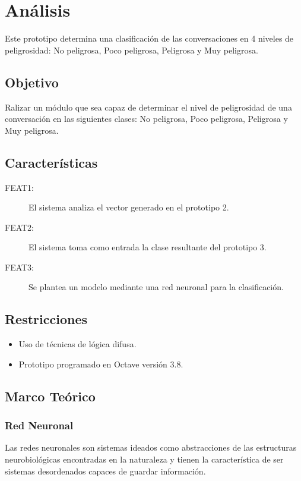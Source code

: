 \section{An\'alisis}
Este prototipo determina una clasificaci\'on de las conversaciones en 4 niveles de peligrosidad: No peligrosa, Poco peligrosa, Peligrosa y Muy peligrosa. 

\subsection{Objetivo}
Ralizar un m\'odulo que sea capaz de determinar el nivel de peligrosidad de una conversaci\'on en las siguientes clases: No peligrosa, Poco peligrosa, Peligrosa y Muy peligrosa. 

\subsection{Caracter\'isticas}
\begin{description}
\item[FEAT1:] El sistema analiza el vector generado en el prototipo 2.
\item[FEAT2:] El sistema toma como entrada la clase resultante del prototipo 3.
\item[FEAT3:] Se plantea un modelo mediante una red neuronal para la clasificaci\'on.

\end{description}

\subsection{Restricciones}

\begin{itemize}
\item  Uso de t\'ecnicas de l\'ogica difusa.
\item  Prototipo programado en Octave versi\'on 3.8.
\end{itemize}

\subsection{Marco Te\'orico}
\subsubsection{Red Neuronal}
Las redes neuronales son sistemas ideados como abstracciones de las estructuras neurobiol\'ogicas encontradas en la naturaleza y tienen la caracter\'istica de ser sistemas desordenados capaces de guardar informaci\'on.


